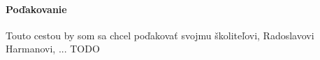 

\vfill
\thispagestyle{empty}
\paragraph{Poďakovanie}

Touto cestou by som sa chcel poďakovať svojmu školiteľovi, Radoslavovi Harmanovi, ... TODO
